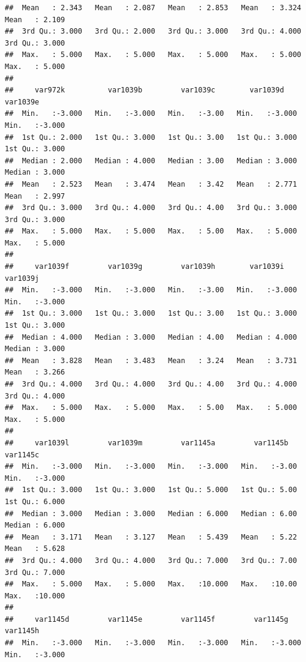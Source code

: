 \documentclass[
]{book}
\begin{document}
\begin{verbatim}
##  Mean   : 2.343   Mean   : 2.087   Mean   : 2.853   Mean   : 3.324   Mean   : 2.109  
##  3rd Qu.: 3.000   3rd Qu.: 2.000   3rd Qu.: 3.000   3rd Qu.: 4.000   3rd Qu.: 3.000  
##  Max.   : 5.000   Max.   : 5.000   Max.   : 5.000   Max.   : 5.000   Max.   : 5.000  
##                                                                                      
##     var972k          var1039b         var1039c        var1039d         var1039e     
##  Min.   :-3.000   Min.   :-3.000   Min.   :-3.00   Min.   :-3.000   Min.   :-3.000  
##  1st Qu.: 2.000   1st Qu.: 3.000   1st Qu.: 3.00   1st Qu.: 3.000   1st Qu.: 3.000  
##  Median : 2.000   Median : 4.000   Median : 3.00   Median : 3.000   Median : 3.000  
##  Mean   : 2.523   Mean   : 3.474   Mean   : 3.42   Mean   : 2.771   Mean   : 2.997  
##  3rd Qu.: 3.000   3rd Qu.: 4.000   3rd Qu.: 4.00   3rd Qu.: 3.000   3rd Qu.: 3.000  
##  Max.   : 5.000   Max.   : 5.000   Max.   : 5.00   Max.   : 5.000   Max.   : 5.000  
##                                                                                     
##     var1039f         var1039g         var1039h        var1039i         var1039j     
##  Min.   :-3.000   Min.   :-3.000   Min.   :-3.00   Min.   :-3.000   Min.   :-3.000  
##  1st Qu.: 3.000   1st Qu.: 3.000   1st Qu.: 3.00   1st Qu.: 3.000   1st Qu.: 3.000  
##  Median : 4.000   Median : 3.000   Median : 4.00   Median : 4.000   Median : 3.000  
##  Mean   : 3.828   Mean   : 3.483   Mean   : 3.24   Mean   : 3.731   Mean   : 3.266  
##  3rd Qu.: 4.000   3rd Qu.: 4.000   3rd Qu.: 4.00   3rd Qu.: 4.000   3rd Qu.: 4.000  
##  Max.   : 5.000   Max.   : 5.000   Max.   : 5.00   Max.   : 5.000   Max.   : 5.000  
##                                                                                     
##     var1039l         var1039m         var1145a         var1145b        var1145c     
##  Min.   :-3.000   Min.   :-3.000   Min.   :-3.000   Min.   :-3.00   Min.   :-3.000  
##  1st Qu.: 3.000   1st Qu.: 3.000   1st Qu.: 5.000   1st Qu.: 5.00   1st Qu.: 6.000  
##  Median : 3.000   Median : 3.000   Median : 6.000   Median : 6.00   Median : 6.000  
##  Mean   : 3.171   Mean   : 3.127   Mean   : 5.439   Mean   : 5.22   Mean   : 5.628  
##  3rd Qu.: 4.000   3rd Qu.: 4.000   3rd Qu.: 7.000   3rd Qu.: 7.00   3rd Qu.: 7.000  
##  Max.   : 5.000   Max.   : 5.000   Max.   :10.000   Max.   :10.00   Max.   :10.000  
##                                                                                     
##     var1145d         var1145e         var1145f         var1145g         var1145h     
##  Min.   :-3.000   Min.   :-3.000   Min.   :-3.000   Min.   :-3.000   Min.   :-3.000  

\end{verbatim}
\end{document}
